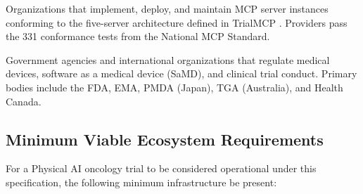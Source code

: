 \documentclass[11pt,letterpaper]{article}
\begin{document}
\begin{description}[leftmargin=3.5cm, style=sameline]
  \item[MCP Infrastructure Providers] Organizations that implement, deploy, and maintain MCP server instances conforming to the five-server architecture defined in TrialMCP \cite{kawchak2026mcp}. Providers \SHALL{} pass the 331 conformance tests from the National MCP Standard.

  \item[Regulatory Bodies] Government agencies and international organizations that regulate medical devices, software as a medical device (SaMD), and clinical trial conduct. Primary bodies include the FDA, EMA, PMDA (Japan), TGA (Australia), and Health Canada.
\end{description}

\subsection{Minimum Viable Ecosystem Requirements}

For a Physical AI oncology trial to be considered operational under this specification, the following minimum infrastructure \SHALL{} be present:
\end{document}
